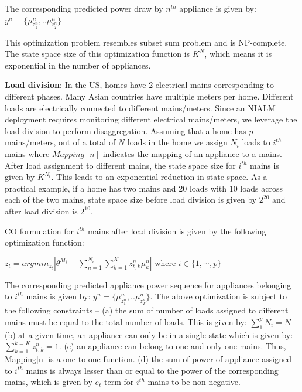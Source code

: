 \documentclass[conference]{IEEEtran}
\begin{document}
\noindent The corresponding predicted power draw by $n^{th}$ appliance is given by: $y^n=\{\mu_{z_1^n}^n,..\mu_{z_T^n}^n \}$

\noindent This optimization problem resembles subset sum problem \cite{knapsack} and is NP-complete. The state space size of this optimization function is $K^N$, which means it is exponential in the number of appliances. 


\noindent \textbf{Load division}: In the US, homes have 2 electrical mains corresponding to different phases. Many Asian countries have multiple meters per home. Different loads are electrically connected to different mains/meters. Since an NIALM deployment requires monitoring different electrical mains/meters, we leverage the load division to perform disaggregation. Assuming that a home has $p$ mains/meters, out of a total of $N$ loads in the home we assign $N_i$ loads to $i^{th}$ mains where $Mapping[n]$ indicates the mapping of an appliance to a mains.
After load assignment to different mains, the state space size for $i^{th}$ mains is given by $K^{N_i}$. This leads to an exponential reduction in state space. As a practical example, if a home has two mains and 20 loads with 10 loads across each of the two mains, state space size before load division is given by $2^{20}$ and after load division is $2^{10}$.

\noindent CO formulation for $i^{th}$ mains after load division is given by the following optimization function: 

$z_t=arg min_{z_t}|\theta^{M_i}-\sum\limits_{n=1}^{N_i}\sum\limits_{k=1}^{K}z_{t,k}^n\mu_k^n|$ where $i\in \{1,\cdots,p\}$

\noindent The corresponding predicted appliance power sequence for appliances belonging to $i^{th}$ mains is given by: $y^n=\{\mu_{z_1^n}^n,..\mu_{z_T^n}^n \}$. The above optimization is subject to the following constraints -- (a) the sum of number of loads assigned to different mains must be equal to the total number of loads. This is given by: $\sum\limits_{1}^{p}{N_i}=N$ (b) at a given time, an appliance can only be in a single state which is given by: $\sum\limits_{k=1}^{k=K} z_{t,k}^n=1$. (c) an appliance can belong to one and only one mains. Thus, Mapping[n] is a one to one function. (d) the sum of power of appliance assigned to $i^{th}$ mains is always lesser than or equal to the power of the corresponding mains, which is given by $e_t$ term for $i^{th}$ mains to be non negative.
\end{document}
